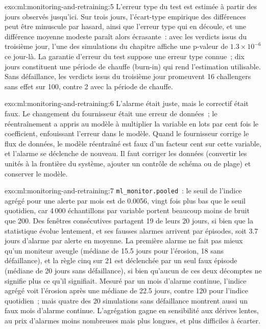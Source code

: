 \begin{solution}{exo:ml:monitoring-and-retraining:5}
L'erreur type du test est estimée à partir des jours observés jusqu'ici. Sur trois jours, l'écart-type empirique des différences
peut être minuscule par hasard, ainsi que l'erreur type qui en découle, et une différence moyenne modeste paraît alors écrasante~: avec les verdicts
issus du troisième jour, l'une des simulations du chapitre affiche une p-valeur de $1.3\times10^{-6}$ ce jour-là. La garantie d'erreur du test
suppose une erreur type connue~; dix jours constituent une période de chauffe (burn-in) qui rend l'estimation utilisable. Sans défaillance, les verdicts issus du troisième
jour promeuvent 16 challengers sans effet sur 100, contre 2 avec la période de chauffe.
\end{solution}

\begin{solution}{exo:ml:monitoring-and-retraining:6}
L'alarme était juste, mais le correctif était faux. Le changement du fournisseur était une erreur de données~; le réentraînement a appris au modèle à multiplier la
variable en lots par cent fois le coefficient, enfouissant l'erreur dans le modèle. Quand le fournisseur corrige le flux de données, le
modèle réentraîné est faux d'un facteur cent sur cette variable, et l'alarme se déclenche de nouveau. Il faut corriger les données (convertir les unités à la
frontière du système, ajouter un contrôle de schéma ou de plage) et conserver le modèle.
\end{solution}

\begin{solution}{exo:ml:monitoring-and-retraining:7}
\texttt{ml\_monitor.pooled}~: le seuil de l'indice agrégé pour une alerte par mois est de 0.0056, vingt fois plus bas que le seuil quotidien, car
4\,000 échantillons par variable portent beaucoup moins de bruit que 200. Des fenêtres consécutives partagent 19 de leurs 20 jours, si bien que la
statistique évolue lentement, et ses fausses alarmes arrivent par épisodes, soit 3.7 jours d'alarme par alerte en moyenne. La première alarme ne fait pas mieux qu'un moniteur aveugle
(médiane de 15.5 jours pour l'érosion, 18 sans défaillance), et la règle cinq sur 21 est déclenchée par un seul faux épisode (médiane de 20
jours sans défaillance), si bien qu'aucun de ces deux décomptes ne signifie plus ce qu'il signifiait. Mesuré par un mois d'alarme continue, l'indice agrégé voit
l'érosion après une médiane de 22.5 jours, contre 120 pour l'indice quotidien~; mais quatre des 20 simulations sans défaillance montrent aussi un faux
mois d'alarme continue. L'agrégation gagne en sensibilité aux dérives lentes, au prix d'alarmes moins nombreuses mais plus longues, et plus difficiles à écarter.
\end{solution}

